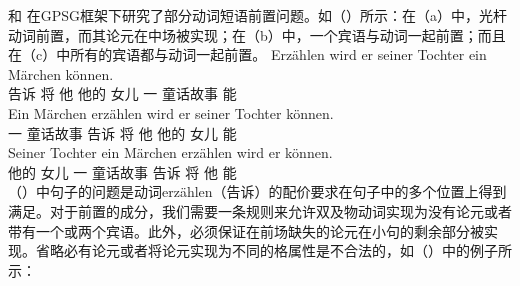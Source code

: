  \citet{Nerbonne86a}和 \citet{Johnson86a}在GPSG框架下研究了部分动词短语前置问题。如（）所示：在（a）中，光杆动词前置，而其论元在中场被实现；在（b）中，一个宾语与动词一起前置；而且在（c）中所有的宾语都与动词一起前置。
\eal
\ex 
\gll Erzählen wird er seiner Tochter ein Märchen können.\\
     告诉  将 他 他的 女儿 一 童话故事 能\\
\ex 
\gll Ein Märchen erzählen wird er seiner Tochter können.\\
     一 童话故事 告诉 将 他 他的 女儿 能\\
\ex 
\gll Seiner Tochter ein Märchen erzählen wird er können.\\
     他的 女儿 一 童话故事 告诉 将 他 能\\
\zl
（）中句子的问题是动词erzählen（告诉）的配价要求在句子中的多个位置上得到满足。对于前置的成分，我们需要一条规则来允许双及物动词实现为没有论元或者带有一个或两个宾语。此外，必须保证在前场缺失的论元在小句的剩余部分被实现。省略必有论元或者将论元实现为不同的格属性是不合法的，如（）中的例子所示：
